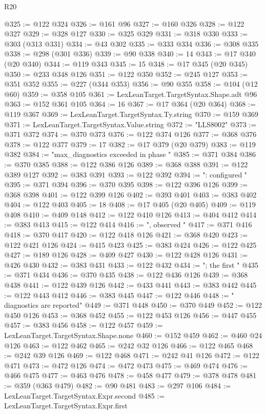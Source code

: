 \begin{lexlean}{R20}
\begin{coremodule}
@325 := @122 @324
@326 := @161 @96
@327 := @160 @326
@328 := @122 @327
@329 := @328 @127
@330 := @325 @329
@331 := @318 @330
@333 := @303 (@313 @331)
@334 := @43 @302
@335 := @333 @334
@336 := @308 @335
@338 := @298 (@301 @336)
@339 := @90 @338
@340 := 14
@343 := @17 @340 (@20 @340)
@344 := @119 @343
@345 := 15
@348 := @17 @345 (@20 @345)
@350 := @233 @348 @126
@351 := @122 @350
@352 := @245 @127
@353 := @351 @352
@355 := @227 (@344 @353)
@356 := @90 @355
@358 := @104 (@12 @60)
@359 := @358 @105
@361 := LexLeanTarget.TargetSyntax.Shape.adt @96
@363 := @152 @361 @105
@364 := 16
@367 := @17 @364 (@20 @364)
@368 := @119 @367
@369 := LexLeanTarget.TargetSyntax.Ty.string
@370 := @159 @369
@371 := LexLeanTarget.TargetSyntax.Value.string
@372 := "LLS8002"
@373 := @371 @372
@374 := @370 @373
@376 := @122 @374 @126
@377 := @368 @376
@378 := @122 @377
@379 := 17
@382 := @17 @379 (@20 @379)
@383 := @119 @382
@384 := "max_diagnostics exceeded in phase "
@385 := @371 @384
@386 := @370 @385
@388 := @122 @386 @126
@389 := @368 @388
@391 := @122 @389 @127
@392 := @383 @391
@393 := @122 @392
@394 := ": configured "
@395 := @371 @394
@396 := @370 @395
@398 := @122 @396 @126
@399 := @368 @398
@401 := @122 @399 @126
@402 := @393 @401
@403 := @383 @402
@404 := @122 @403
@405 := 18
@408 := @17 @405 (@20 @405)
@409 := @119 @408
@410 := @409 @148
@412 := @122 @410 @126
@413 := @404 @412
@414 := @383 @413
@415 := @122 @414
@416 := ", observed "
@417 := @371 @416
@418 := @370 @417
@420 := @122 @418 @126
@421 := @368 @420
@423 := @122 @421 @126
@424 := @415 @423
@425 := @383 @424
@426 := @122 @425
@427 := @189 @126
@428 := @409 @427
@430 := @122 @428 @126
@431 := @426 @430
@432 := @383 @431
@433 := @122 @432
@434 := "; the first "
@435 := @371 @434
@436 := @370 @435
@438 := @122 @436 @126
@439 := @368 @438
@441 := @122 @439 @126
@442 := @433 @441
@443 := @383 @442
@445 := @122 @443 @412
@446 := @383 @445
@447 := @122 @446
@448 := " diagnostics are reported"
@449 := @371 @448
@450 := @370 @449
@452 := @122 @450 @126
@453 := @368 @452
@455 := @122 @453 @126
@456 := @447 @455
@457 := @383 @456
@458 := @122 @457
@459 := LexLeanTarget.TargetSyntax.Shape.none
@460 := @152 @459
@462 := @460 @24 @126
@463 := @122 @462
@465 := @242 @32 @126
@466 := @122 @465
@468 := @242 @39 @126
@469 := @122 @468
@471 := @242 @41 @126
@472 := @122 @471
@473 := @472 @126
@474 := @472 @473
@475 := @469 @474
@476 := @466 @475
@477 := @463 @476
@478 := @458 @477
@479 := @378 @478
@481 := @359 (@363 @479)
@482 := @90 @481
@483 := @297 @106
@484 := LexLeanTarget.TargetSyntax.Expr.second
@485 := LexLeanTarget.TargetSyntax.Expr.first

\end{coremodule}
\end{lexlean}
